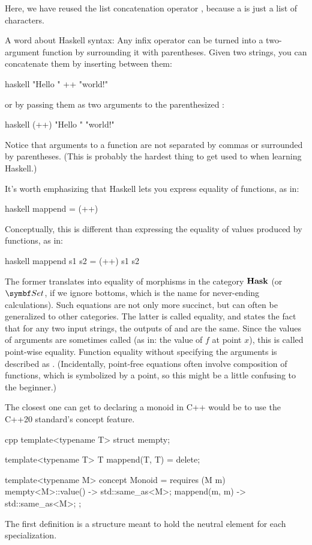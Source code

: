 Here, we have reused the list concatenation operator \code{(++)},
because a  is just a list of characters.

A word about Haskell syntax: Any infix operator can be turned into a
two-argument function by surrounding it with parentheses. Given two
strings, you can concatenate them by inserting \code{++} between them:

\begin{snip}{haskell}
"Hello " ++ "world!"
\end{snip}
or by passing them as two arguments to the parenthesized \code{(++)}:

\begin{snip}{haskell}
(++) "Hello " "world!"
\end{snip}
Notice that arguments to a function are not separated by commas or
surrounded by parentheses. (This is probably the hardest thing to get
used to when learning Haskell.)

It's worth emphasizing that Haskell lets you express equality of
functions, as in:

\begin{snip}{haskell}
mappend = (++)
\end{snip}
Conceptually, this is different than expressing the equality of values
produced by functions, as in:

\begin{snip}{haskell}
mappend s1 s2 = (++) s1 s2
\end{snip}
The former translates into equality of morphisms in the category
$\mathbf{Hask}$ (or $\Set$, if we ignore bottoms, which is the name
for never-ending calculations). Such equations are not only more
succinct, but can often be generalized to other categories. The latter
is called  equality, and states the fact that for any
two input strings, the outputs of  and \code{(++)} are
the same. Since the values of arguments are sometimes called
 (as in: the value of $f$ at point $x$), this is called
point-wise equality. Function equality without specifying the arguments
is described as . (Incidentally, point-free equations
often involve composition of functions, which is symbolized by a point,
so this might be a little confusing to the beginner.)

The closest one can get to declaring a monoid in C++ would be to use the
C++20 standard's concept feature.

\begin{snip}{cpp}
template<typename T>
struct mempty;

template<typename T>
T mappend(T, T) = delete;

template<typename M>
concept Monoid = requires (M m) {
    { mempty<M>::value() } -> std::same_as<M>;
    { mappend(m, m) } -> std::same_as<M>;
};
\end{snip}
The first definition is a structure meant to hold the neutral element for each
specialization.

